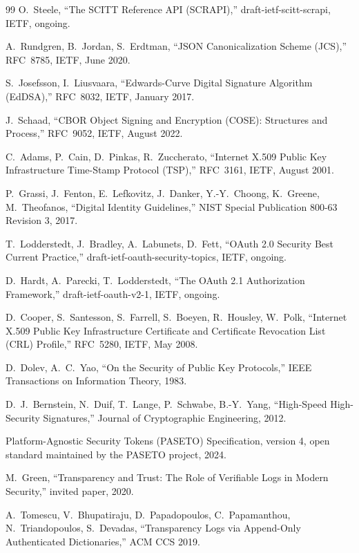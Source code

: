 \documentclass[11pt,a4paper]{article}
\begin{document}
\begin{thebibliography}{99}
 O.~Steele, ``The SCITT Reference API (SCRAPI),'' draft-ietf-scitt-scrapi, IETF, ongoing.

 A.~Rundgren, B.~Jordan, S.~Erdtman, ``JSON Canonicalization Scheme (JCS),'' RFC~8785, IETF, June 2020.

 S.~Josefsson, I.~Liusvaara, ``Edwards-Curve Digital Signature Algorithm (EdDSA),'' RFC~8032, IETF, January 2017.

 J.~Schaad, ``CBOR Object Signing and Encryption (COSE): Structures and Process,'' RFC~9052, IETF, August 2022.

 C.~Adams, P.~Cain, D.~Pinkas, R.~Zuccherato, ``Internet X.509 Public Key Infrastructure Time-Stamp Protocol (TSP),'' RFC~3161, IETF, August 2001.

 P.~Grassi, J.~Fenton, E.~Lefkovitz, J.~Danker, Y.-Y.~Choong, K.~Greene, M.~Theofanos, ``Digital Identity Guidelines,'' NIST Special Publication 800-63 Revision 3, 2017.

 T.~Lodderstedt, J.~Bradley, A.~Labunets, D.~Fett, ``OAuth 2.0 Security Best Current Practice,'' draft-ietf-oauth-security-topics, IETF, ongoing.

 D.~Hardt, A.~Parecki, T.~Lodderstedt, ``The OAuth 2.1 Authorization Framework,'' draft-ietf-oauth-v2-1, IETF, ongoing.

 D.~Cooper, S.~Santesson, S.~Farrell, S.~Boeyen, R.~Housley, W.~Polk, ``Internet X.509 Public Key Infrastructure Certificate and Certificate Revocation List (CRL) Profile,'' RFC~5280, IETF, May 2008.

 D.~Dolev, A.~C.~Yao, ``On the Security of Public Key Protocols,'' IEEE Transactions on Information Theory, 1983.

 D.~J.~Bernstein, N.~Duif, T.~Lange, P.~Schwabe, B.-Y.~Yang, ``High-Speed High-Security Signatures,'' Journal of Cryptographic Engineering, 2012.

 Platform-Agnostic Security Tokens (PASETO) Specification, version 4, open standard maintained by the PASETO project, 2024.

 M.~Green, ``Transparency and Trust: The Role of Verifiable Logs in Modern Security,'' invited paper, 2020.

 A.~Tomescu, V.~Bhupatiraju, D.~Papadopoulos, C.~Papamanthou, N.~Triandopoulos, S.~Devadas, ``Transparency Logs via Append-Only Authenticated Dictionaries,'' ACM CCS 2019.

\end{thebibliography}
\end{document}
